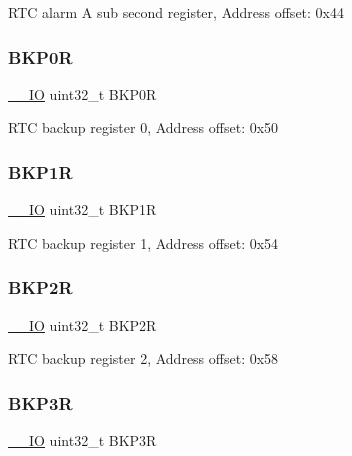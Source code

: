 R\+TC alarm A sub second register, Address offset\+: 0x44 \mbox{\label{struct_r_t_c___type_def_a4808ec597e5a5fefd8a83a9127dd1aec}} 
\subsubsection{\texorpdfstring{B\+K\+P0R}{BKP0R}}
{\footnotesize\ttfamily \hyperlink{core__sc300_8h_aec43007d9998a0a0e01faede4133d6be}{\+\_\+\+\_\+\+IO} uint32\+\_\+t B\+K\+P0R}

R\+TC backup register 0, Address offset\+: 0x50 \mbox{\label{struct_r_t_c___type_def_af85290529fb82acef7c9fcea3718346c}} 
\subsubsection{\texorpdfstring{B\+K\+P1R}{BKP1R}}
{\footnotesize\ttfamily \hyperlink{core__sc300_8h_aec43007d9998a0a0e01faede4133d6be}{\+\_\+\+\_\+\+IO} uint32\+\_\+t B\+K\+P1R}

R\+TC backup register 1, Address offset\+: 0x54 \mbox{\label{struct_r_t_c___type_def_aaa251a80daa57ad0bd7db75cb3b9cdec}} 
\subsubsection{\texorpdfstring{B\+K\+P2R}{BKP2R}}
{\footnotesize\ttfamily \hyperlink{core__sc300_8h_aec43007d9998a0a0e01faede4133d6be}{\+\_\+\+\_\+\+IO} uint32\+\_\+t B\+K\+P2R}

R\+TC backup register 2, Address offset\+: 0x58 \mbox{\label{struct_r_t_c___type_def_a0b1eeda834c3cfd4d2c67f242f7b2a1c}} 
\subsubsection{\texorpdfstring{B\+K\+P3R}{BKP3R}}
{\footnotesize\ttfamily \hyperlink{core__sc300_8h_aec43007d9998a0a0e01faede4133d6be}{\+\_\+\+\_\+\+IO} uint32\+\_\+t B\+K\+P3R}

